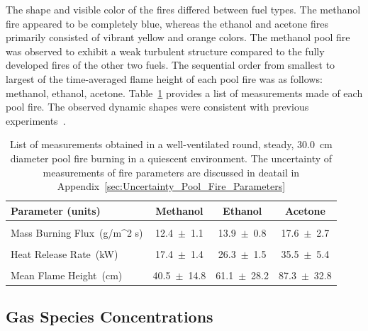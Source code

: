 \documentclass[12pt]{article}
\begin{document}
The shape and visible color of the fires differed between fuel types. The methanol fire appeared to be completely blue, whereas the ethanol and acetone fires primarily consisted of vibrant yellow and orange colors. The methanol pool fire was observed to exhibit a weak turbulent structure compared to the fully developed fires of the other two fuels. The sequential order from smallest to largest of the time-averaged flame height of each pool fire was as follows: methanol, ethanol, acetone. Table~\ref{tab:Pool_Fire_Parameters_Table} provides a list of measurements made of each pool fire. The observed dynamic shapes were consistent with previous experiments~\cite{Hamins2016,Hamins1994,Hamins1991,Hamins1996,Lock2008}.

\begin{table}[!]
\caption{List of measurements obtained in a well-ventilated round, steady, 30.0~\si{cm} diameter pool fire burning in a quiescent environment. The uncertainty of measurements of fire parameters are discussed in deatail in Appendix~\ref{sec:Uncertainty_Pool_Fire_Parameters}}
\label{tab:Pool_Fire_Parameters_Table}
\centering
	\footnotesize
	\begin{tabular}{lccc}
\hline
\textbf{Parameter (units)} &\textbf{Methanol}& \textbf{Ethanol}& \textbf{Acetone}\\
\hline
\\[0.01cm]
Mass Burning Flux~(\si{g/{m^2 s}})		&	12.4~$\pm$~1.1		&	13.9~$\pm$~0.8	&	17.6~$\pm$~2.7\\
\\[0.01cm]
Heat Release Rate~(\si{kW})			&	17.4~$\pm$~1.4		&	26.3~$\pm$~1.5	&	35.5~$\pm$~5.4\\
\\[0.01cm]
Mean Flame Height~(\si{cm})			&	40.5~$\pm$~14.8		&	61.1~$\pm$~28.2	&	87.3~$\pm$~32.8\\
\hline
\end{tabular}
\end{table}




\subsection{Gas Species Concentrations}
\label{ssec:Gas_Species_Concentrations}
\end{document}
